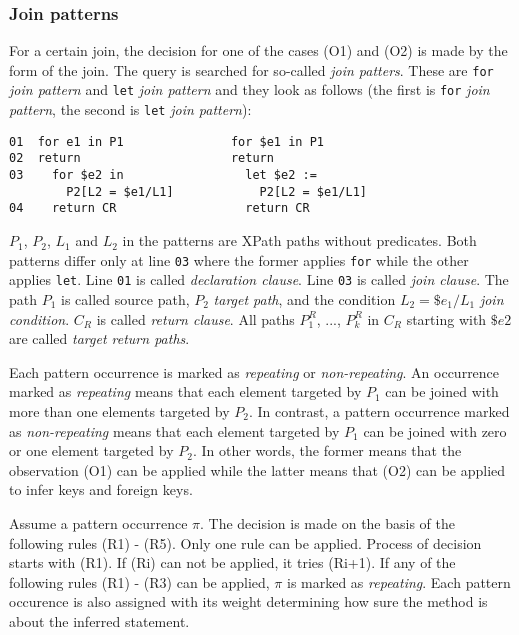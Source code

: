 \subsubsection{Join patterns}
For a certain join, the decision for one of the cases (O1) and (O2) is made by the form of the join. The query is searched for so-called \emph{join patters}. These are \texttt{for} \emph{join pattern} and \texttt{let} \emph{join pattern} and they look as follows (the first is \texttt{for} \emph{join pattern}, the second is \texttt{let} \emph{join pattern}):

\begin{verbatim}
01  for e1 in P1               for $e1 in P1
02  return                     return
03    for $e2 in                 let $e2 :=
        P2[L2 = $e1/L1]            P2[L2 = $e1/L1]
04    return CR                  return CR
\end{verbatim}

$P_1$, $P_2$, $L_1$ and $L_2$ in the patterns are XPath paths without predicates. Both patterns differ only at line \texttt{03} where the former applies \texttt{for} while the other applies \texttt{let}. Line \texttt{01} is called \emph{declaration clause}. Line \texttt{03} is called \emph{join clause}. The path $P_1$ is called source path, $P_2$ \emph{target path}, and the condition $L_2 = \$e_1/L_1$ \emph{join condition}. $C_R$ is called \emph{return clause}. All paths $P_1^R$, ..., $P_k^R$ in $C_R$
starting with $\$e2$ are called \emph{target return paths}.

Each pattern occurrence is marked as \emph{repeating} or \emph{non-repeating}. An occurrence marked as \emph{repeating} means that each element targeted by $P_1$ can be joined with more than one elements targeted by $P_2$. In contrast, a pattern occurrence marked as \emph{non-repeating} means that each element targeted by $P_1$ can be joined with zero or one element targeted by $P_2$. In other words, the former means that the observation (O1) can be applied while the latter means that (O2) can be applied to infer keys and foreign keys.

Assume a pattern occurrence $\pi$. The decision is made on the basis of the following rules (R1) - (R5). Only one rule can be applied. Process of decision starts with (R1). If (Ri) can not be applied, it tries (Ri+1). If any of the following rules (R1) - (R3) can be applied, $\pi$ is marked as \emph{repeating}. Each pattern occurence is also assigned with its weight determining how sure the method is about the inferred statement.

